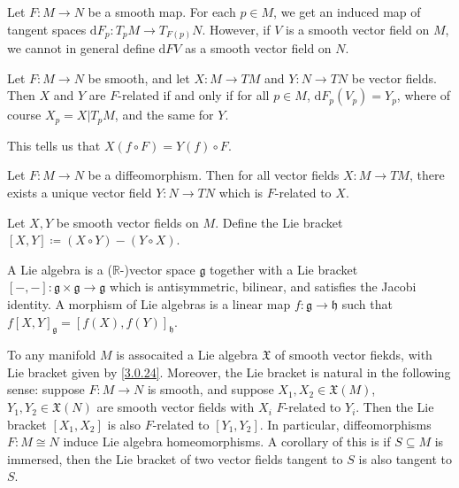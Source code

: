 
Let $F : M \to N$ be a smooth map. For each $p\in M$, we get an induced map of tangent spaces $\mathrm{d} F_p : T_pM \to T_{F(p)} N$. However, if $V$ is a smooth vector field on $M$, we cannot in general define $\mathrm{d} FV$ as a smooth vector field on $N$.

\begin{definition}\label{???}
	Let $F : M \to N$ be smooth, and let $X : M \to TM$ and $Y : N \to TN$ be vector fields. Then $X$ and $Y$ are $F$-related if and only if for all $p\in M$, $\mathrm{d} F_p(V_p)=Y_p$, where of course $X_p=X|T_pM$, and the same for $Y$.
\end{definition}

This tells us that $X(f\circ F)=Y(f)\circ F$.

\begin{proposition}\label{3.0.23}
	Let $F : M \to N$ be a diffeomorphism. Then for all vector fields $X : M \to TM$, there exists a unique vector field $Y : N \to TN$ which is $F$-related to $X$.
\end{proposition}
\begin{definition}\label{3.0.24}
	Let $X,Y$ be smooth vector fields on $M$. Define the Lie bracket $[X,Y]\coloneqq (X\circ Y)-(Y\circ X)$.
\end{definition}

\begin{definition}\label{3.0.25}
	A Lie algebra is a ($\mathbb{R} $-)vector space $\mathfrak{g} $ together with a Lie bracket $[-,-]: \mathfrak{g} \times \mathfrak{g}  \to \mathfrak{g} $ which is antisymmetric, bilinear, and satisfies the Jacobi identity. A morphism of Lie algebras is a linear map $f : \mathfrak{g}  \to \mathfrak{h} $ such that $f[X,Y]_\mathfrak{g}=[f(X),f(Y)]_\mathfrak{h}$.
\end{definition}

To any manifold $M$ is assocaited a Lie algebra $\mathfrak{X} $ of smooth vector fiekds, with Lie bracket given by \cref{3.0.24}. Moreover, the Lie bracket is natural in the following sense: suppose $F : M \to N$ is smooth, and suppose $X_1,X_2\in \mathfrak{X} (M)$, $Y_1,Y_2\in \mathfrak{X} (N)$ are smooth vector fields with $X_i$ $F$-related to $Y_i$. Then the Lie bracket $[X_1,X_2]$ is also $F$-related to $[Y_1,Y_2]$. In particular, diffeomorphisms $F : M \cong N$ induce Lie algebra homeomorphisms. A corollary of this is if $S\subseteq M$ is immersed, then the Lie bracket of two vector fields tangent to $S$ is also tangent to $S$.

